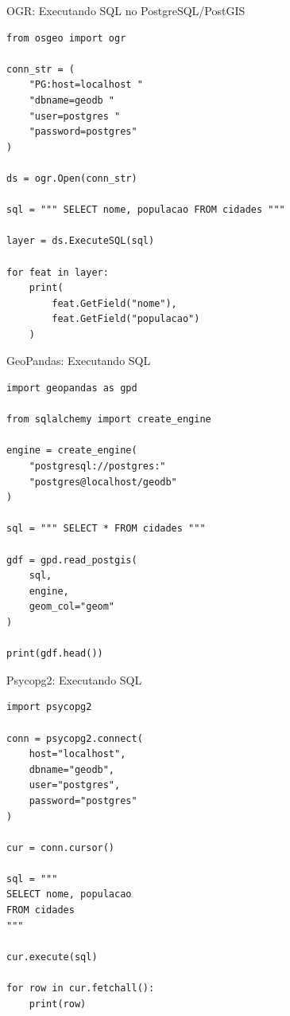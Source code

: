 \documentclass{beamer}
\begin{document}
\begin{frame}[fragile]{OGR: Executando SQL no PostgreSQL/PostGIS}

\begin{verbatim}
from osgeo import ogr

conn_str = (
    "PG:host=localhost "
    "dbname=geodb "
    "user=postgres "
    "password=postgres"
)

ds = ogr.Open(conn_str)

sql = """ SELECT nome, populacao FROM cidades """

layer = ds.ExecuteSQL(sql)

for feat in layer:
    print(
        feat.GetField("nome"),
        feat.GetField("populacao")
    )
\end{verbatim}

\end{frame}

\begin{frame}[fragile]{GeoPandas: Executando SQL}

\begin{verbatim}
import geopandas as gpd

from sqlalchemy import create_engine

engine = create_engine(
    "postgresql://postgres:"
    "postgres@localhost/geodb"
)

sql = """ SELECT * FROM cidades """

gdf = gpd.read_postgis(
    sql,
    engine,
    geom_col="geom"
)

print(gdf.head())
\end{verbatim}

\end{frame}

\begin{frame}[fragile]{Psycopg2: Executando SQL}

\begin{verbatim}
import psycopg2

conn = psycopg2.connect(
    host="localhost",
    dbname="geodb",
    user="postgres",
    password="postgres"
)

cur = conn.cursor()

sql = """
SELECT nome, populacao
FROM cidades
"""

cur.execute(sql)

for row in cur.fetchall():
    print(row)
\end{verbatim}

\end{frame}
\end{document}
